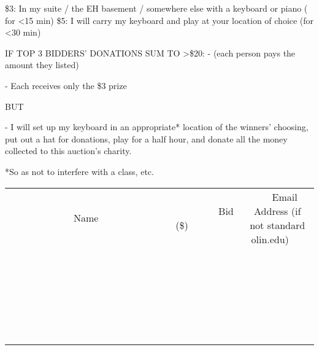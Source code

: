 \documentclass[11pt]{article}
\begin{document}
\$3: In my suite / the EH basement / somewhere else with a keyboard or piano ( for <15 min)
\$5: I will carry my keyboard and play at your location of choice (for <30 min)

IF TOP 3 BIDDERS' DONATIONS SUM TO >\$20:
- (each person pays the amount they listed)

- Each receives only the \$3 prize

BUT

- I will set up my keyboard in an appropriate* location of the winners' choosing, put out a hat for donations, play for a half hour, and donate all the money collected to this auction's charity.


*So as not to interfere with a class, etc.
\\[6ex]
\begin{tabular}{c c c}
~~~~~~~~~~~~~Name~~~~~~~~~~~~~ & ~~~~~~~~~Bid (\$)~~~~~~~~~  & ~~~Email Address (if not standard olin.edu)~~~\\
 & & \\
\hline
 & & \\
\hline
 & & \\
\hline
 & & \\
\hline
 & & \\
\hline
 & & \\
\hline
 & & \\
\hline
 & & \\
\hline
 & & \\
\hline
 & & \\
\hline
 & & \\
\hline
 & & \\
\hline
 & & \\
\hline
 & & \\
\hline
 & & \\
\hline
 & & \\
\hline
 & & \\
\hline
 & & \\
\hline
 & & \\
\hline
 & & \\
\hline
 & & \\
\hline
 & & \\
\hline
 & & \\
\hline
 & & \\
\hline
 & & \\
\hline
 & & \\
\hline
\end{tabular}
\newpage
\end{document}
